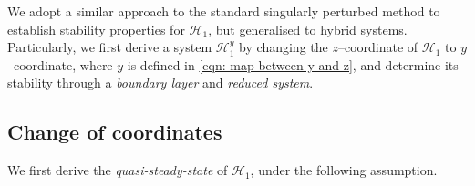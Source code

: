 %
%
%
We adopt a similar approach to the standard singularly perturbed method \cite[Section 11.5]{nonlinear_systems_Khalil} to establish stability properties for $\mathcal{H}_1$, but generalised to hybrid systems. Particularly, we first derive a system $\mathcal{H}_1^y$ by changing the $z$--coordinate of $\mathcal{H}_1$ to $y$--coordinate, where $y$ is defined in \eqref{eqn: map between y and z}, and determine its stability through a \emph{boundary layer} and \emph{reduced system}. 
\subsection{Change of coordinates}

 
%
We first derive the \emph{quasi-steady-state} of $\mathcal{H}_1$, under the following assumption.


